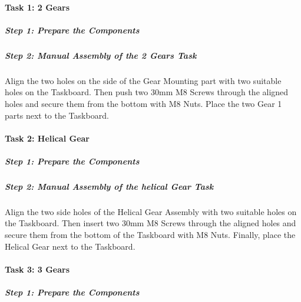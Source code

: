 \documentclass[letterpaper,10pt,english]{sphinxmanual}
\let\sphinxpxdimen\pdfpxdimen\else\newdimen\sphinxpxdimen
\begin{document}
\noindent{\hspace*{\fill}\sphinxincludegraphics[width=400\sphinxpxdimen]{{gear_assembly_taskboard}.png}\hspace*{\fill}}


\paragraph{Task 1: 2 Gears}
\label{\detokenize{3-Assembly-Instructions-Gear-Assembly:task-1-2-gears}}

\subparagraph{Step 1: Prepare the Components}
\label{\detokenize{3-Assembly-Instructions-Gear-Assembly:step-1-prepare-the-components}}

\subparagraph{Step 2: Manual Assembly of the 2 Gears Task}
\label{\detokenize{3-Assembly-Instructions-Gear-Assembly:step-2-manual-assembly-of-the-2-gears-task}}
\sphinxAtStartPar
Align the two holes on the side of the Gear Mounting part with two suitable holes on the Taskboard. Then push two 30mm M8 Screws through the aligned holes and secure them from the bottom with M8 Nuts.
Place the two Gear 1 parts next to the Taskboard.


\paragraph{Task 2: Helical Gear}
\label{\detokenize{3-Assembly-Instructions-Gear-Assembly:task-2-helical-gear}}

\subparagraph{Step 1: Prepare the Components}
\label{\detokenize{3-Assembly-Instructions-Gear-Assembly:id1}}

\subparagraph{Step 2: Manual Assembly of the helical Gear Task}
\label{\detokenize{3-Assembly-Instructions-Gear-Assembly:step-2-manual-assembly-of-the-helical-gear-task}}
\sphinxAtStartPar
Align the two side holes of the Helical Gear Assembly with two suitable holes on the Taskboard. Then insert two 30mm M8 Screws through the aligned holes and secure them from the bottom of the Taskboard with M8 Nuts.
Finally, place the Helical Gear next to the Taskboard.


\paragraph{Task 3: 3 Gears}
\label{\detokenize{3-Assembly-Instructions-Gear-Assembly:task-3-3-gears}}

\subparagraph{Step 1: Prepare the Components}
\label{\detokenize{3-Assembly-Instructions-Gear-Assembly:id2}}
\end{document}

